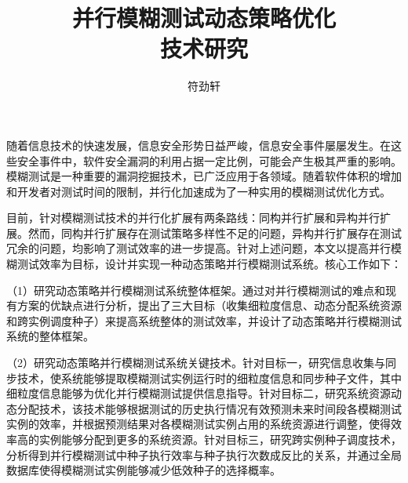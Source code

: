 \documentclass[master]{thesis-uestc}
\title{并行模糊测试动态策略优化\\技术研究}{Research on Parallel Fuzzing with Dynamic Strategy Optimization Techniques} %
\author{符劲轩}{Jingxuan Fu} %
\begin{document}
\makecover %
\originalitydeclaration %
\begin{chineseabstract}


随着信息技术的快速发展，信息安全形势日益严峻，信息安全事件屡屡发生。在这些安全事件中，软件安全漏洞的利用占据一定比例，可能会产生极其严重的影响。模糊测试是一种重要的漏洞挖掘技术，已广泛应用于各领域。随着软件体积的增加和开发者对测试时间的限制，并行化加速成为了一种实用的模糊测试优化方式。


目前，针对模糊测试技术的并行化扩展有两条路线：同构并行扩展和异构并行扩展。然而，同构并行扩展存在测试策略多样性不足的问题，异构并行扩展存在测试冗余的问题，均影响了测试效率的进一步提高。针对上述问题，本文以提高并行模糊测试效率为目标，设计并实现一种动态策略并行模糊测试系统。核心工作如下：


（1）研究动态策略并行模糊测试系统整体框架。通过对并行模糊测试的难点和现有方案的优缺点进行分析，提出了三大目标（收集细粒度信息、动态分配系统资源和跨实例调度种子）来提高系统整体的测试效率，并设计了动态策略并行模糊测试系统的整体框架。

（2）研究动态策略并行模糊测试系统关键技术。针对目标一，研究信息收集与同步技术，使系统能够提取模糊测试实例运行时的细粒度信息和同步种子文件，其中细粒度信息能够为优化并行模糊测试提供信息指导。针对目标二，研究系统资源动态分配技术，该技术能够根据测试的历史执行情况有效预测未来时间段各模糊测试实例的效率，并根据预测结果对各模糊测试实例占用的系统资源进行调整，使得效率高的实例能够分配到更多的系统资源。针对目标三，研究跨实例种子调度技术，分析得到并行模糊测试中种子执行效率与种子执行次数成反比的关系，并通过全局数据库使得模糊测试实例能够减少低效种子的选择概率。


\end{chineseabstract}
\end{document}
